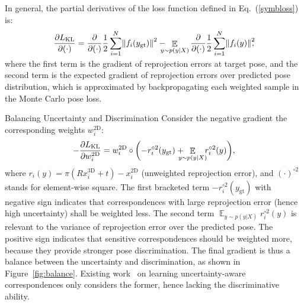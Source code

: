 \documentclass[10pt,twocolumn,letterpaper]{article}
\makeatletter
\let\originalleft\left
\let\originalright\right
\renewcommand{\left}{\mathopen{}\mathclose\bgroup\originalleft}
\renewcommand{\right}{\aftergroup\egroup\originalright}
\let\originalpartial\partial
\renewcommand{\partial}{\mathop{}\!\mathrm{\originalpartial}}
\newcommand{\expect}{\mathop{\mathbb{E}}}
\renewcommand{\paragraph}{
  \@startsection{paragraph}{4}
  {\z@}{1.0ex \@plus 0ex \@minus .3ex}{-1em}
  {\normalfont\normalsize\bfseries}
}
\makeatother
\begin{document}
In general, the partial derivatives of the loss function defined in Eq.~(\ref{symbloss}) is:
\vspace{-1ex}
\begin{equation}
\smash[b]{\frac{\partial{L_\text{KL}}}{\partial{(\cdot)}} = \frac{\originalpartial}{\partial{(\cdot)}} \frac{1}{2} \sum_{i=1}^N \left\| f_i(y_\text{gt}) \right\|^2 -
\hspace{-2ex} \expect_{y \sim p(y|X)}{\frac{\originalpartial}{\partial{(\cdot)}} \frac{1}{2} \sum_{i=1}^N \left\| f_i(y) \right\|^2}\mspace{-7mu},} \vphantom{\frac{}{O_o}}
\label{derivative}
\end{equation}
where the first term is the gradient of reprojection errors at target pose, and the second term is the expected gradient of reprojection errors over predicted pose distribution, which is approximated by backpropagating each weighted sample in the Monte Carlo pose loss.

\paragraph{Balancing Uncertainty and Discrimination} Consider the negative gradient \wrt the corresponding weights $w_i^\text{2D}$:
\begin{equation}
-\frac{\partial{L_\text{KL}}}{\partial{w_i^\text{2D}}} = w_i^\text{2D} \circ \left( -r_i^{\circ 2}(y_\text{gt}) + \hspace{-2ex} \expect_{y \sim p(y|X)}{\hspace{-1ex}r_i^{\circ 2}(y)} \right),
\end{equation}
where $r_i(y) = \pi(Rx_i^\text{3D} + t) - x_i^\text{2D}$ (unweighted reprojection error), and $(\cdot)^{\circ 2}$ stands for element-wise square. The first bracketed term $-r_i^{\circ 2}(y_\text{gt})$ with negative sign indicates that correspondences with large reprojection error (hence high uncertainty) shall be weighted less. The second term $\expect_{y \sim p(y|X)}{r_i^{\circ 2}(y)}$ is relevant to the variance of reprojection error over the predicted pose. The positive sign indicates that sensitive correspondences should be weighted more, because they provide stronger pose discrimination. The final gradient is thus a balance between the uncertainty and discrimination, as shown in Figure~\ref{fig:balance}. Existing work~\cite{monorun, pvnet} on learning uncertainty-aware correspondences only considers the former, hence lacking the discriminative ability.
\end{document}
